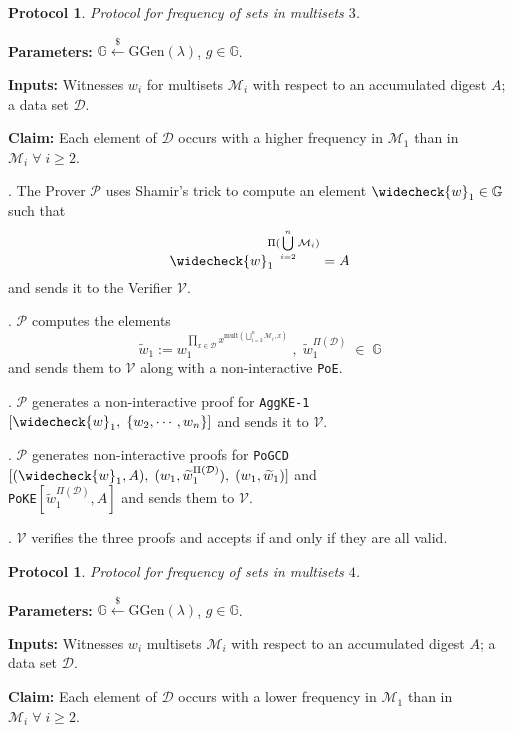 \documentclass[11pt, lettersize, notitlepage, leqno, footskip=0.6cm]{article}
\newcommand{\pl}{\prod\limits}
\newcommand{\wti}{\widetilde}
\newcommand{\mc}{\mathcal}
\newcommand{\mb}{\mathbb}
\newcommand{\mr}{\mathrm}
\newcommand{\lamb}{\lambda}
\newcommand{\weck}{\widecheck}
\newcommand{\mP}{\mc{P}}
\newcommand{\V}{\mc{V}}
\newcommand{\vs}{\vspace{-0.15cm}}
\newcommand{\noin}{\noindent}
\newtheorem{Prot}[Thm]{Protocol}
\numberwithin{equation}{section}
\begin{document}
\bigskip

\begin{Prot} Protocol for frequency of sets in multisets $3$.\end{Prot} \vspace{-0.3cm}

\noin \textbf{Parameters:} $\mb{G}\xleftarrow{\$} \mr{GGen}(\lamb)$,\; $g\in \mb{G}$.

\noin \textbf{Inputs:} Witnesses $w_i$ for multisets $\mc{M}_i$ with respect to an accumulated digest $A$; a data set $\mc{D}$.

\noin \textbf{Claim:} Each element of $\mc{D}$ occurs with a higher frequency in $\mc{M}_1$ than in $\mc{M}_i\;\forall\;i\geq 2$.

\begin{prf1}\noin {}. The Prover $\mP$ uses Shamir's trick to compute an element $\weck{w}_1\in \mb{G}$ such that \vs $$\weck{w}_1 ^{\Pi(\bigcup\limits_{i=2}^n \mc{M}_i)} = A $$ and sends it to the Verifier $\V$.

\noin 2. $\mP$ computes the elements \vs $$\wti{w}_1:= w_1^{\pl_{x\in\mc{D}} x^{\mr{mult}(\bigcup\limits_{i=2}^n \mc{M}_i, x)}}\;,\; \wti{w}_1^{\Pi(\mc{D})}\;\in\;\mb{G}$$ and sends them to $\V$ along with a non-interactive \verb|PoE|.

\noin 3. $\mP$ generates a non-interactive proof for \verb|AggKE-1|$[\weck{w}_1,\;\{w_2,\cdots,w_n\}]$ and sends it to $\V$. 

\noin 4. $\mP$ generates non-interactive proofs for \verb|PoGCD|$[(\weck{w}_1, A),\;(w_1,\wti{w}_1^{\Pi(\mc{D})}),\;(w_1,\wti{w}_1)]$ and\\ \verb|PoKE|$[\wti{w}_1^{\Pi(\mc{D})},A]$ and sends them to $\V$.

\noin 5. $\V$ verifies the three proofs and accepts if and only if they are all valid.\end{prf1}



\begin{Prot} Protocol for frequency of sets in multisets $4$.\end{Prot} \vspace{-0.3cm}

\noin \textbf{Parameters:} $\mb{G}\xleftarrow{\$} \mr{GGen}(\lamb)$,\; $g\in \mb{G}$.

\noin \textbf{Inputs:} Witnesses $w_i$ multisets $\mc{M}_i$ with respect to an accumulated digest $A$; a data set $\mc{D}$.

\noin \textbf{Claim:} Each element of $\mc{D}$ occurs with a lower frequency in $\mc{M}_1$ than in $\mc{M}_i\;\forall\;i\geq 2$.
\end{document}
